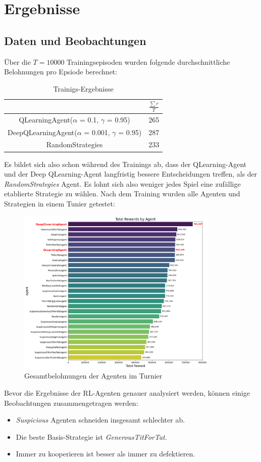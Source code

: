 \chapter{Ergebnisse}
\section{Daten und Beobachtungen}
Über die $T = 10000$ Trainingsepisoden wurden folgende durchschnittliche Belohnungen pro Epsiode berechnet:
\begin{table}[H]
    \centering
    \begin{tabular}{c|c}
            & $\frac{\sum r}{T}$ \\
        \hline
        QLearningAgent($\alpha$ = 0.1, $\gamma$ = 0.95)  & 265 \\
        \hline
        DeepQLearningAgent($\alpha$ = 0.001, $\gamma$ = 0.95) & 287 \\
        \hline
        RandomStrategies & 233
    \end{tabular}
    \caption{Trainigs-Ergebnisse}
    \label{table:trainingsergebnisse}
\end{table}
Es bildet sich also schon während des Trainings ab, dass der QLearning-Agent und der Deep QLearning-Agent langfristig
bessere Entscheidungen treffen, als der \textit{RandomStrategies} Agent. Es lohnt sich also weniger jedes Spiel
eine zufällige etablierte Strategie zu wählen.
Nach dem Training wurden alle Agenten und Strategien in einem Tunier getestet:
\begin{figure}[H]
    \centering
    \includegraphics[height=8cm]{../poster/logos/tournament.png}
    \caption{Gesamtbelohnungen der Agenten im Turnier}
    \label{fig:gesamtbelohnungen}
\end{figure}
Bevor die Ergebnisse der RL-Agenten genauer analysiert werden, können einige Beobachtungen zusammengetragen werden:
\begin{itemize}
    \item \textit{Suspicious} Agenten schneiden insgesamt schlechter ab.
    \item Die beste Basis-Strategie ist \textit{GenerousTitForTat}.
    \item Immer zu kooperieren ist besser als immer zu defektieren.
\end{itemize}

